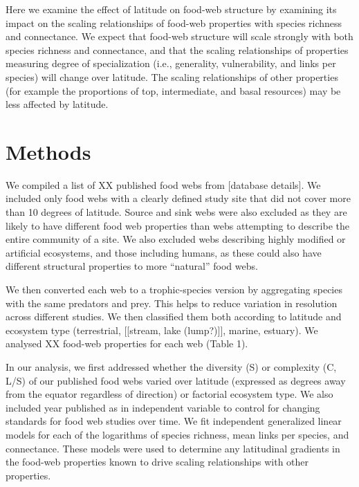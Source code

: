 Here we examine the effect of latitude on food-web structure by examining
its impact on the scaling relationships of food-web properties with species
richness and connectance. We expect that food-web structure will scale strongly
with both species richness and connectance, and that the scaling relationships
of properties measuring degree of specialization (i.e., generality, vulnerability, and
links per species) will change over latitude. The scaling relationships of other
properties (for example the proportions of top, intermediate, and basal resources) may
be less affected by latitude.


\section*{Methods}

We compiled a list of XX published food webs from [database details]. We
included only food webs with a clearly defined study site that did not cover
more than 10 degrees of latitude. Source and sink webs were also excluded as
they are likely to have different food web properties than webs attempting to
describe the entire community of a site. We also excluded webs describing highly
modified or artificial ecosystems, and those including humans, as these could also
have different structural properties to more ``natural'' food webs.


We then converted each web to a trophic-species version by aggregating species
with the same predators and prey. This helps to reduce variation in resolution
across different studies. We then classified them both according to latitude
and ecosystem type (terrestrial, [[stream, lake (lump?)]], marine, estuary). We analysed XX
food-web properties for each web (Table 1).


In our analysis, we first addressed whether the diversity (S) or complexity (C, L/S) of our
published food webs varied over latitude (expressed as degrees away from the
equator regardless of direction) or factorial ecosystem type. We also included
year published as in independent variable to control for changing standards
for food web studies over time. We fit independent generalized linear models
for each of the logarithms of species richness, mean links per species, and
connectance. These models were used to determine any latitudinal gradients in the food-web
properties known to drive scaling relationships with other properties.


